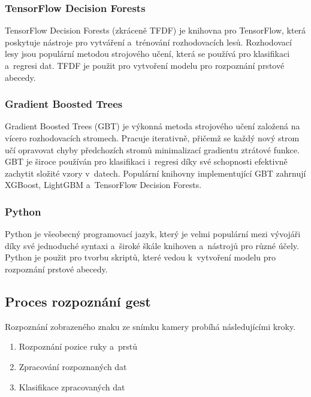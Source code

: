 \documentclass[
  master,
  program=ainfvs,
  biblatex,
  figures=true,
  tables=false,
  sourcecodes=true,
  glossaries,
  index
]{kidiplom}
\begin{document}
        \subsubsection{TensorFlow Decision Forests}
                TensorFlow Decision Forests (zkráceně TFDF) je knihovna pro TensorFlow, která poskytuje nástroje pro vytváření a~trénování rozhodovacích lesů. Rozhodovací lesy jsou populární metodou strojového učení, která se používá pro klasifikaci a~regresi dat. TFDF je použit pro vytvoření modelu pro rozpoznání prstové abecedy. \cite{tensorflow-tfdf}

       \subsubsection{Gradient Boosted Trees}
            Gradient Boosted Trees (GBT) je výkonná metoda strojového učení založená na vícero rozhodovacích stromech. Pracuje iterativně, přičemž se každý nový strom učí opravovat chyby předchozích stromů minimalizací gradientu ztrátové funkce. GBT je široce používán pro klasifikaci i~regresi díky své schopnosti efektivně zachytit složité vzory v~datech. Populární knihovny implementující GBT zahrnují XGBoost, LightGBM a~TensorFlow Decision Forests. \cite{gbdt}
                
        \subsubsection{Python}
                Python je všeobecný programovací jazyk, který je velmi populární mezi vývojáři díky své jednoduché syntaxi a~široké škále knihoven a~nástrojů pro různé účely. Python je použit pro tvorbu skriptů, které vedou k~vytvoření modelu pro rozpoznání prstové abecedy.

    
    \subsection{Proces rozpoznání gest}
        Rozpoznání zobrazeného znaku ze snímku kamery probíhá následujícími kroky.

        \begin{enumerate}
            \item Rozpoznání pozice ruky a~prstů
            \item Zpracování rozpoznaných dat
            \item Klasifikace zpracovaných dat
        \end{enumerate}
\end{document}
